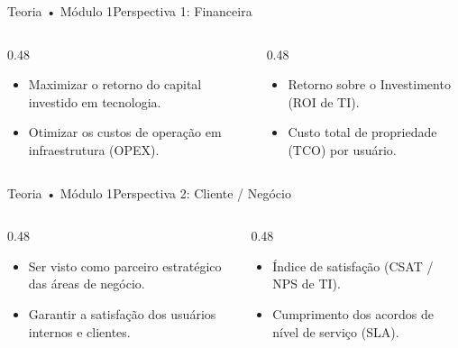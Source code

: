 \begin{senaiframe}{Teoria • Módulo 1}{Perspectiva 1: Financeira}
  \begin{columns}[t]
    \begin{column}{0.48\textwidth}
      \begin{tcolorbox}[senaigreencard, title={Objetivos Típicos}]
        \begin{itemize}
          \item Maximizar o retorno do capital investido em tecnologia.
          \item Otimizar os custos de operação em infraestrutura (OPEX).
        \end{itemize}
      \end{tcolorbox}
    \end{column}
    \begin{column}{0.48\textwidth}
      \begin{tcolorbox}[senaibluecard, title={Indicadores Chave}]
        \begin{itemize}
          \item Retorno sobre o Investimento (ROI de TI).
          \item Custo total de propriedade (TCO) por usuário.
        \end{itemize}
      \end{tcolorbox}
    \end{column}
  \end{columns}
\end{senaiframe}

\begin{senaiframe}{Teoria • Módulo 1}{Perspectiva 2: Cliente / Negócio}
  \begin{columns}[t]
    \begin{column}{0.48\textwidth}
      \begin{tcolorbox}[senaibluecard, title={Objetivos Típicos}]
        \begin{itemize}
          \item Ser visto como parceiro estratégico das áreas de negócio.
          \item Garantir a satisfação dos usuários internos e clientes.
        \end{itemize}
      \end{tcolorbox}
    \end{column}
    \begin{column}{0.48\textwidth}
      \begin{tcolorbox}[senaicard, title={Indicadores Chave}]
        \begin{itemize}
          \item Índice de satisfação (CSAT / NPS de TI).
          \item Cumprimento dos acordos de nível de serviço (SLA).
        \end{itemize}
      \end{tcolorbox}
    \end{column}
  \end{columns}
\end{senaiframe}


